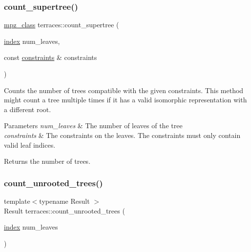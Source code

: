 \subsubsection{\texorpdfstring{count\+\_\+supertree()}{count\_supertree()}\hspace{0.1cm}{\footnotesize\ttfamily [2/2]}}
{\footnotesize\ttfamily \hyperlink{gmpxx_8h_a4194ba637e08ba88fb6b56747cc0ee6c}{mpz\+\_\+class} terraces\+::count\+\_\+supertree (\begin{DoxyParamCaption}\item[{\hyperlink{namespaceterraces_adbc33ccb543d1634e96d0eb02e472c77}{index}}]{num\+\_\+leaves,  }\item[{const \hyperlink{namespaceterraces_a6f603ffd30ed4d902fce6424492e0581}{constraints} \&}]{constraints }\end{DoxyParamCaption})}

Counts the number of trees compatible with the given constraints. This method might count a tree multiple times if it has a valid isomorphic representation with a different root. 
\begin{DoxyParams}{Parameters}
{\em num\+\_\+leaves} & The number of leaves of the tree \\
\hline
{\em constraints} & The constraints on the leaves. The constraints must only contain valid leaf indices. \\
\hline
\end{DoxyParams}
\begin{DoxyReturn}{Returns}
the number of trees. 
\end{DoxyReturn}
\mbox{\label{namespaceterraces_a3e839fe10a095b681cf4e7ef3ef687b9}} 
\subsubsection{\texorpdfstring{count\+\_\+unrooted\+\_\+trees()}{count\_unrooted\_trees()}}
{\footnotesize\ttfamily template$<$typename Result $>$ \\
Result terraces\+::count\+\_\+unrooted\+\_\+trees (\begin{DoxyParamCaption}\item[{\hyperlink{namespaceterraces_adbc33ccb543d1634e96d0eb02e472c77}{index}}]{num\+\_\+leaves }\end{DoxyParamCaption})}


